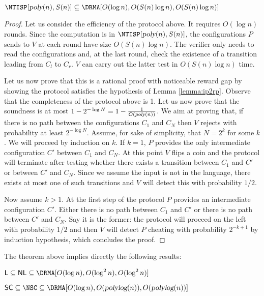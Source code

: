 \begin{theorem}
$\NTISP[\poly(n), S(n)] \subseteq \DRMA[O(\log n), O(S(n)\log n), O(S(n)\log n)]$
\end{theorem}
\begin{proof}
Let us consider the efficiency of the protocol above.
It requires $O(\log n)$ rounds.
Since the computation is in $\NTISP[\poly(n), S(n)]$, the configurations $P$ sends to $V$ at each round have size $O(S(n) \log n)$.
The verifier only needs to read the configurations and, at the last round, check the existence of a transition leading from $C_l$ to $C_r$. $V$ can carry out the latter test in $O(S(n) \log n)$ time.

Let us now prove that this is a rational proof with noticeable reward gap by showing the protocol satisfies the hypothesis of Lemma \ref{lemma:ip2rp}. Observe that the completeness of the protocol above is 1. 
Let us now prove that the soundness is at most $1 - 2^{-\log N} = 1 - \frac{1}{O({\textsl{poly}}(n))}$.
We aim at proving that, if there is no path between the configurations $C_1$ and $C_N$ then $V$ rejects with probability at least $2^{-\log N}$.
Assume, for sake of simplicity, that $N = 2^k$ for some $k$. We will proceed by induction on $k$. If $k=1$, $P$ provides the only intermediate configuration $C'$ between $C_1$ and $C_N$. At this point $V$ flips a coin and the protocol will terminate after testing whether there exists a transition between $C_1$ and $C'$ or between $C'$ and $C_N$. Since we assume the input is not in the language, there exists at most one of such transitions and $V$ will detect this with probability $1/2$.

Now assume $k > 1$. At the first step of the protocol $P$ provides an intermediate configuration $C'$. Either there is no path between $C_1$ and $C'$ or there is no path between $C'$ and $C_N$. Say it is the former: the protocol will proceed on the left with probability $1/2$ and then $V$ will detect $P$ cheating with probability $2^{-k+1}$ by induction hypothesis, which concludes the proof.
\end{proof}

\medskip
\noindent
The theorem above implies directly the following results:

\begin{corollary}
$ \L \subseteq \NL \subseteq \DRMA[O(\log n), O(\log^2 n ), O(\log^2 n )]$
\end{corollary}


\begin{corollary}
$ \SC \subseteq  \NSC \subseteq \DRMA[O(\log n), O(\polylog(n)), O(\polylog(n))]$
\end{corollary}
